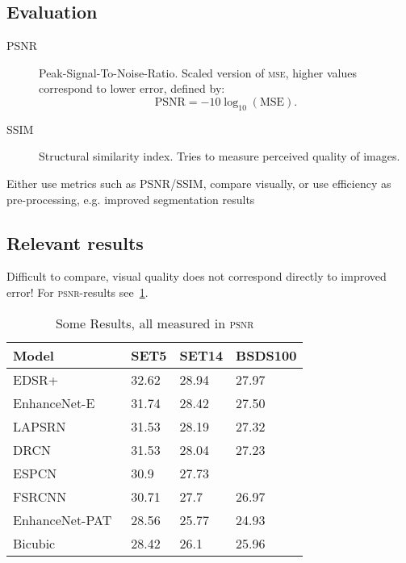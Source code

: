 \documentclass{scrartcl}
\begin{document}
\subsection{Evaluation}\label{sec:evaluation}
\begin{description}
\item[PSNR] Peak-Signal-To-Noise-Ratio. Scaled version of \textsc{mse}, higher values correspond to lower error, defined by:
  \begin{equation}
  \label{eq:psnr}
  \mathrm{PSNR} = -10 \log_{10} (\mathrm{MSE}).
\end{equation}
\item[SSIM] Structural similarity index. Tries to measure perceived quality of images.
\end{description}

Either use metrics such as PSNR/SSIM, compare visually, or use efficiency as pre-processing, e.g. improved segmentation results

\subsection{Relevant results}
Difficult to compare, visual quality does not correspond directly to improved error!
For \textsc{psnr}-results see~\cref{tab:results}.

\begin{table}[]
\centering
\caption{Some Results, all measured in \textsc{psnr}}

\label{tab:results}
\begin{tabular}{@{}llll@{}}
\toprule
Model          & SET5  & SET14 & BSDS100 \\ \midrule
EDSR+~\cite{EDSR} & 32.62 & 28.94 & 27.97 \\
EnhanceNet-E~\cite{EnhanceNet}   & 31.74 & 28.42 & 27.50   \\
LAPSRN~\cite{LapSRN}         & 31.53 & 28.19 & 27.32   \\
DRCN~\cite{DRCN}           & 31.53 & 28.04 & 27.23   \\
ESPCN~\cite{Espcn}       & 30.9  & 27.73 &         \\
FSRCNN~\cite{Fsrcnn}         & 30.71 & 27.7  & 26.97   \\
EnhanceNet-PAT~\cite{EnhanceNet} & 28.56 & 25.77 & 24.93   \\
Bicubic        & 28.42 & 26.1  & 25.96   \\ \bottomrule
\end{tabular}
\end{table}

\printbibliography
\end{document}
